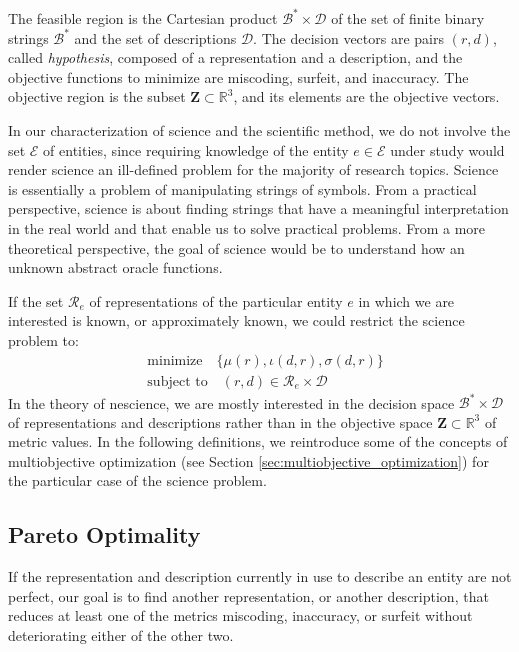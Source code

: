 The feasible region is the Cartesian product $\mathcal{B}^\ast \times \mathcal{D}$ of the set of finite binary strings $\mathcal{B}^\ast$ and the set of descriptions $\mathcal{D}$. The decision vectors are pairs $(r, d)$, called \emph{hypothesis}, composed of a representation and a description, and the objective functions to minimize are miscoding, surfeit, and inaccuracy. The objective region is the subset $\mathbf{Z} \subset \mathbb{R}^3$, and its elements are the objective vectors.

In our characterization of science and the scientific method, we do not involve the set $\mathcal{E}$ of entities, since requiring knowledge of the entity $e \in \mathcal{E}$ under study would render science an ill-defined problem for the majority of research topics. Science is essentially a problem of manipulating strings of symbols. From a practical perspective, science is about finding strings that have a meaningful interpretation in the real world and that enable us to solve practical problems. From a more theoretical perspective, the goal of science would be to understand how an unknown abstract oracle functions.

If the set $\mathcal{R}_e$ of representations of the particular entity $e$ in which we are interested is known, or approximately known, we could restrict the science problem to:
\begin{align*}
 & \text{minimize} \quad \{ \mu(r), \iota(d, r), \sigma(d, r)\} \\
 & \text{subject to} \quad (r, d) \in \mathcal{R}_e \times \mathcal{D}
\end{align*}
In the theory of nescience, we are mostly interested in the decision space $\mathcal{B}^\ast \times \mathcal{D}$ of representations and descriptions rather than in the objective space $\mathbf{Z} \subset \mathbb{R}^3$ of metric values. In the following definitions, we reintroduce some of the concepts of multiobjective optimization (see Section \ref{sec:multiobjective_optimization}) for the particular case of the science problem.

\subsection*{Pareto Optimality}

If the representation and description currently in use to describe an entity are not perfect, our goal is to find another representation, or another description, that reduces at least one of the metrics miscoding, inaccuracy, or surfeit without deteriorating either of the other two.

